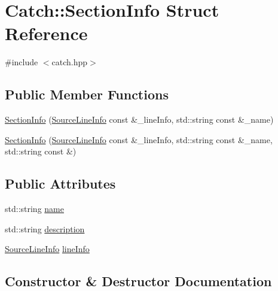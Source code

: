 \hypertarget{struct_catch_1_1_section_info}{}\section{Catch\+:\+:Section\+Info Struct Reference}
\label{struct_catch_1_1_section_info}


{\ttfamily \#include $<$catch.\+hpp$>$}

\subsection*{Public Member Functions}
\begin{DoxyCompactItemize}
\item 
\mbox{\hyperlink{struct_catch_1_1_section_info_a2808437ae7d4bc0830cee1c3995165a6}{Section\+Info}} (\mbox{\hyperlink{struct_catch_1_1_source_line_info}{Source\+Line\+Info}} const \&\+\_\+line\+Info, std\+::string const \&\+\_\+name)
\item 
\mbox{\hyperlink{struct_catch_1_1_section_info_a139875f2e7bd12a5898a948f8bad15b3}{Section\+Info}} (\mbox{\hyperlink{struct_catch_1_1_source_line_info}{Source\+Line\+Info}} const \&\+\_\+line\+Info, std\+::string const \&\+\_\+name, std\+::string const \&)
\end{DoxyCompactItemize}
\subsection*{Public Attributes}
\begin{DoxyCompactItemize}
\item 
std\+::string \mbox{\hyperlink{struct_catch_1_1_section_info_a704c8fc662d309137e0d4f199cb7df58}{name}}
\item 
std\+::string \mbox{\hyperlink{struct_catch_1_1_section_info_a0052060219a6de74bb7ade34d4163a4e}{description}}
\item 
\mbox{\hyperlink{struct_catch_1_1_source_line_info}{Source\+Line\+Info}} \mbox{\hyperlink{struct_catch_1_1_section_info_adbc83b8a3507c4acc8ee249e93465711}{line\+Info}}
\end{DoxyCompactItemize}


\subsection{Constructor \& Destructor Documentation}
\mbox{\label{struct_catch_1_1_section_info_a2808437ae7d4bc0830cee1c3995165a6}} 
